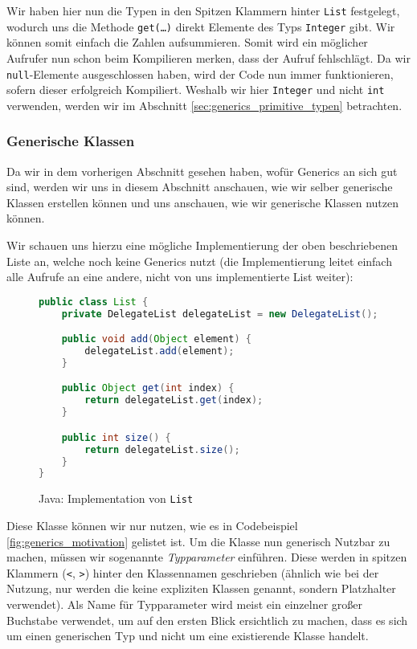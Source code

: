 		Wir haben hier nun die Typen in den Spitzen Klammern hinter \texttt{List} festgelegt, wodurch uns die Methode \texttt{get(\dots)} direkt Elemente des Typs \texttt{Integer} gibt. Wir können somit einfach die Zahlen aufsummieren. Somit wird ein möglicher Aufrufer nun schon beim Kompilieren merken, dass der Aufruf fehlschlägt. Da wir \texttt{null}-Elemente ausgeschlossen haben, wird der Code nun immer funktionieren, sofern dieser erfolgreich Kompiliert. Weshalb wir hier \texttt{Integer} und nicht \texttt{int} verwenden, werden wir im Abschnitt \ref{sec:generics_primitive_typen} betrachten.

	\subsubsection{Generische Klassen}
		Da wir in dem vorherigen Abschnitt gesehen haben, wofür Generics an sich gut sind, werden wir uns in diesem Abschnitt anschauen, wie wir selber generische Klassen erstellen können und uns anschauen, wie wir generische Klassen nutzen können.
		
		Wir schauen uns hierzu eine mögliche Implementierung der oben beschriebenen Liste an, welche noch keine Generics nutzt (die Implementierung leitet einfach alle Aufrufe an eine andere, nicht von uns implementierte List weiter):
		\begin{figure}[H]
			\centering
			\begin{lstlisting}[language = Java, style = base]
public class List {
	private DelegateList delegateList = new DelegateList();

	public void add(Object element) {
		delegateList.add(element);
	}

	public Object get(int index) {
		return delegateList.get(index);
	}

	public int size() {
		return delegateList.size();
	}
}
			\end{lstlisting}
			\caption{Java: Implementation von \texttt{List}}
		\end{figure}
		
		Diese Klasse können wir nur nutzen, wie es in Codebeispiel \ref{fig:generics_motivation} gelistet ist. Um die Klasse nun generisch Nutzbar zu machen, müssen wir sogenannte \textit{Typparameter} einführen. Diese werden in spitzen Klammern (\texttt{<}, \texttt{>}) hinter den Klassennamen geschrieben (ähnlich wie bei der Nutzung, nur werden die keine expliziten Klassen genannt, sondern Platzhalter verwendet). Als Name für Typparameter wird meist ein einzelner großer Buchstabe verwendet, um auf den ersten Blick ersichtlich zu machen, dass es sich um einen generischen Typ und nicht um eine existierende Klasse handelt.
		
